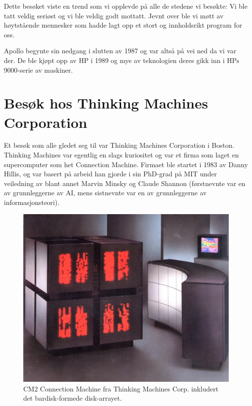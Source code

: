 \documentclass[../../main.tex]{subfiles}
\begin{document}
Dette besøket viste en trend som vi opplevde på alle de stedene vi besøkte: Vi ble tatt veldig seriøst og vi ble veldig godt mottatt. Jevnt over ble vi møtt av høytstående mennesker som hadde lagt opp et stort og innholdsrikt program for oss. 

Apollo begynte sin nedgang i slutten av 1987 og var altså på vei ned da vi var der. De ble kjøpt opp av HP i 1989 og mye av teknologien deres gikk inn i HPs 9000-serie av maskiner.

\section{Besøk hos Thinking Machines Corporation}

Et besøk som alle gledet seg til var Thinking Machines Corporation i Boston. Thinking Machines var egentlig en slags kuriositet og var et firma som laget en supercomputer som het Connection Machine. Firmaet ble startet i 1983 av Danny Hillis, og var basert på arbeid han gjorde i sin PhD-grad på MIT under veiledning av blant annet Marvin Minsky og Claude Shannon (førstnevnte var en av grunnleggerne av AI, mens sistnevnte var en av grunnleggerne av informasjonsteori).

\begin{figure}
	\includegraphics{images/usa88/cm2.jpg}
	\caption{CM2 Connection Machine fra Thinking Machines Corp. inkludert det bardisk-formede disk-arrayet.}
\end{figure}
\end{document}
